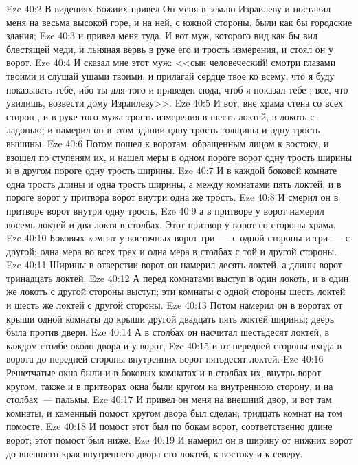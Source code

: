 \vs Eze 40:2 В видениях Божиих привел Он меня в землю Израилеву и поставил меня на весьма высокой горе, и на ней, с южной стороны, были как бы городские здания;
\vs Eze 40:3 и привел меня туда. И вот муж, которого вид как бы вид блестящей меди, и льняная вервь в руке его и трость измерения, и стоял он у ворот.
\vs Eze 40:4 И сказал мне этот муж: <<сын человеческий! смотри глазами твоими и слушай ушами твоими, и прилагай сердце твое ко всему, что я буду показывать тебе, ибо ты для того и приведен сюда, чтоб я показал тебе ; все, что увидишь, возвести дому Израилеву>>.
\vs Eze 40:5 И вот, вне храма стена со всех сторон , и в руке того мужа трость измерения в шесть локтей,  в локоть с ладонью; и намерил он в этом здании одну трость толщины и одну трость вышины.
\vs Eze 40:6 Потом пошел к воротам, обращенным лицом к востоку, и взошел по ступеням их, и нашел меры в одном пороге ворот одну трость ширины и в другом пороге одну трость ширины.
\vs Eze 40:7 И в каждой боковой комнате одна трость длины и одна трость ширины, а между комнатами пять локтей, и в пороге ворот у притвора ворот внутри одна же трость.
\vs Eze 40:8 И смерил он в притворе ворот внутри одну трость,
\vs Eze 40:9 а в притворе у ворот намерил восемь локтей и два локтя в столбах. Этот притвор у ворот со стороны храма.
\vs Eze 40:10 Боковых комнат у восточных ворот три~--- с одной стороны и три~--- с другой; одна мера во всех трех и одна мера в столбах с той и другой стороны.
\vs Eze 40:11 Ширины в отверстии ворот он намерил десять локтей, а длины ворот тринадцать локтей.
\vs Eze 40:12 А перед комнатами выступ в один локоть, и в один же локоть с другой стороны выступ; эти комнаты с одной стороны  шесть локтей и шесть же локтей с другой стороны.
\vs Eze 40:13 Потом намерил он в воротах от крыши одной комнаты до крыши другой двадцать пять локтей ширины; дверь была против двери.
\vs Eze 40:14 А в столбах он насчитал шестьдесят локтей, в каждом столбе около двора и у ворот,
\vs Eze 40:15 и от передней стороны входа в ворота до передней стороны внутренних ворот пятьдесят локтей.
\vs Eze 40:16 Решетчатые окна были и в боковых комнатах и в столбах их, внутрь ворот кругом, также и в притворах окна были кругом на внутреннюю сторону, и на столбах~--- пальмы.
\vs Eze 40:17 И привел он меня на внешний двор, и вот там комнаты, и каменный помост кругом двора был сделан; тридцать комнат на том помосте.
\vs Eze 40:18 И помост этот был по бокам ворот, соответственно длине ворот; этот помост был ниже.
\vs Eze 40:19 И намерил он в ширину от нижних ворот до внешнего края внутреннего двора сто локтей, к востоку и к северу.
